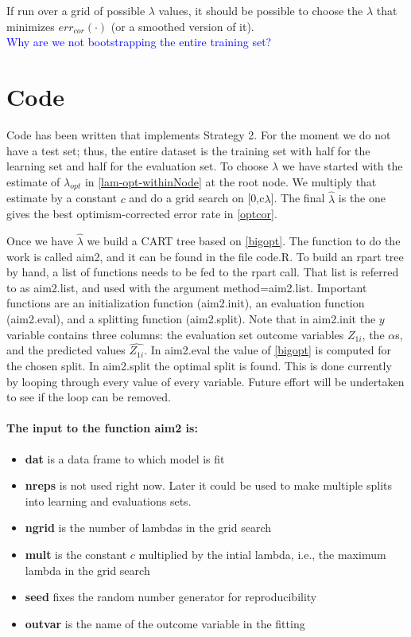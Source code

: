 \documentclass[12pt]{article}
\begin{document}
If run over a grid of possible $\lambda$ values,  it should be possible to choose 
the $\lambda$ that minimizes $err_{cor}(\cdot)$ (or a smoothed version of it).\\

\textcolor{blue} {Why are we not bootstrapping the entire training set?}

\section{Code}

Code has been written that implements Strategy 2. For the moment we do not have a test set; thus, the entire dataset is the training set with half for the learning set and half
 for the evaluation set. To choose $\lambda$ we have started with
the estimate of $\lambda_{opt}$ in \eqref{lam-opt-withinNode} at the root node.  We multiply that
estimate by a constant $c$ and do a grid search on [0,c$\lambda$].
The final $\hat{\lambda}$ is the one gives the best optimism-corrected
error rate in \eqref{optcor}.

Once we have $\hat{\lambda}$ we build a CART tree based on
\eqref{bigopt}.   The function to do the work is
called aim2, and it can be found in the file code.R.  To build an
rpart tree by hand, a list of functions needs to be fed to the rpart
call. That list is referred to as aim2.list, and used with the argument
method=aim2.list.  Important functions are an initialization function
(aim2.init), an evaluation function (aim2.eval), and a splitting
function (aim2.split).  Note that in aim2.init the $y$ variable
contains three columns: the evaluation set outcome variables $Z_{1i}$, the $\alpha$s,
and the predicted values $\widehat{Z_{1i}}$.  In aim2.eval the value
of \eqref{bigopt} is computed for the chosen split.  In aim2.split the
optimal split is found.  This is done currently by looping through
every value of every variable.  Future effort will be undertaken to
see if the loop can be removed.  

\paragraph{The input to the function {\bf aim2} is:}
\begin{itemize}
\item {\bf dat} is a data frame to which model is fit
\item {\bf nreps} is not used right now.  Later it could be used to make
  multiple splits into learning and evaluations sets.
\item {\bf ngrid} is the number of lambdas in the grid search
\item {\bf mult} is the constant $c$ multiplied by the intial lambda, i.e., the maximum lambda in the grid search
\item {\bf seed} fixes the random number generator for reproducibility
\item {\bf outvar} is the name of the outcome variable in the fitting
\end{itemize}  
\end{document}
